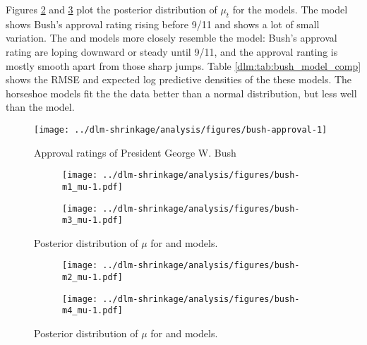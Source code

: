 Figures \ref{dlm:fig:bush_mu1} and \ref{dlm:fig:bush_mu2} plot the posterior distribution of $\mu_{t}$ for the models.
The  model shows Bush's approval rating rising before 9/11 and shows a lot of small variation.
The  and  models more closely resemble the  model:
Bush's approval rating are loping downward or steady until 9/11, and the approval ranting is mostly smooth apart from those sharp jumps.
Table \ref{dlm:tab:bush_model_comp} shows the RMSE and expected log predictive densities of the these models. 
The horseshoe models fit the the data better than a normal distribution, but less well than the  model.

\begin{figure}[thbp!]
  \centering
  \texttt{[image: ../dlm-shrinkage/analysis/figures/bush-approval-1]}
  \caption{Approval ratings of President George W. Bush}
  \label{dlm:fig:bush_approval}
\end{figure}

\begin{figure}[thbp!]
  \centering
  \begin{subfigure}[b]{\linewidth}
    \texttt{[image: ../dlm-shrinkage/analysis/figures/bush-m1\_mu-1.pdf]}
    \caption{}
  \end{subfigure}

  \begin{subfigure}[b]{\linewidth}
    \texttt{[image: ../dlm-shrinkage/analysis/figures/bush-m3\_mu-1.pdf]}
    \caption{}
  \end{subfigure}
  \caption{Posterior distribution of $\mu$ for  and  models.}
  \label{dlm:fig:bush_mu1}
\end{figure}

\begin{figure}[thbp!]
  \begin{subfigure}[b]{\linewidth}
    \texttt{[image: ../dlm-shrinkage/analysis/figures/bush-m2\_mu-1.pdf]}
    \caption{}
  \end{subfigure}

  \begin{subfigure}[b]{\linewidth}
    \texttt{[image: ../dlm-shrinkage/analysis/figures/bush-m4\_mu-1.pdf]}
    \caption{}
  \end{subfigure}
  \caption{Posterior distribution of $\mu$ for  and  models.}
  \label{dlm:fig:bush_mu2}
\end{figure}


